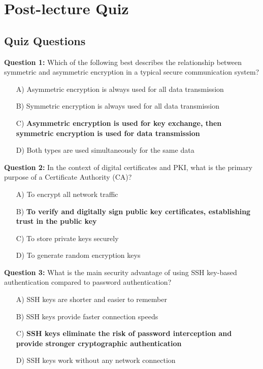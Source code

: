 \section{Post-lecture Quiz}
\label{sec:sec:post-quiz}

\subsection{Quiz Questions}

\textbf{Question 1:} Which of the following best describes the relationship between symmetric and asymmetric encryption in a typical secure communication system?

\begin{enumerate}
    \item[A)] Asymmetric encryption is always used for all data transmission
    \item[B)] Symmetric encryption is always used for all data transmission
    \item[C)] \textbf{Asymmetric encryption is used for key exchange, then symmetric encryption is used for data transmission}
    \item[D)] Both types are used simultaneously for the same data
\end{enumerate}

\textbf{Question 2:} In the context of digital certificates and PKI, what is the primary purpose of a Certificate Authority (CA)?

\begin{enumerate}
    \item[A)] To encrypt all network traffic
    \item[B)] \textbf{To verify and digitally sign public key certificates, establishing trust in the public key}
    \item[C)] To store private keys securely
    \item[D)] To generate random encryption keys
\end{enumerate}

\textbf{Question 3:} What is the main security advantage of using SSH key-based authentication compared to password authentication?

\begin{enumerate}
    \item[A)] SSH keys are shorter and easier to remember
    \item[B)] SSH keys provide faster connection speeds
    \item[C)] \textbf{SSH keys eliminate the risk of password interception and provide stronger cryptographic authentication}
    \item[D)] SSH keys work without any network connection
\end{enumerate}

